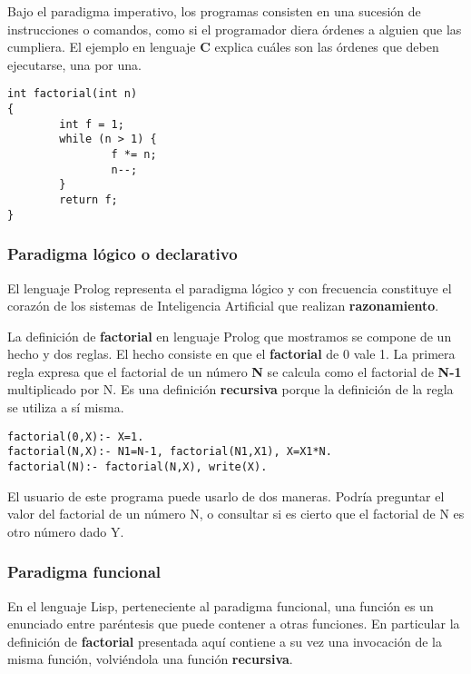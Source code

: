 \documentclass[spanish,A4,]{article}
\begin{document}
Bajo el paradigma imperativo, los programas consisten en una sucesión de
instrucciones o comandos, como si el programador diera órdenes a alguien
que las cumpliera. El ejemplo en lenguaje \textbf{C} explica cuáles son
las órdenes que deben ejecutarse, una por una.

\begin{verbatim}
int factorial(int n)
{
        int f = 1;
        while (n > 1) {
                f *= n;
                n--;
        }
        return f;
}
\end{verbatim}

\subsubsection{Paradigma lógico o
declarativo}\label{paradigma-luxf3gico-o-declarativo}

El lenguaje Prolog representa el paradigma lógico y con frecuencia
constituye el corazón de los sistemas de Inteligencia Artificial que
realizan \textbf{razonamiento}.

La definición de \textbf{factorial} en lenguaje Prolog que mostramos se
compone de un hecho y dos reglas. El hecho consiste en que el
\textbf{factorial} de 0 vale 1. La primera regla expresa que el
factorial de un número \textbf{N} se calcula como el factorial de
\textbf{N-1} multiplicado por N. Es una definición \textbf{recursiva}
porque la definición de la regla se utiliza a sí misma.

\begin{verbatim}
factorial(0,X):- X=1.
factorial(N,X):- N1=N-1, factorial(N1,X1), X=X1*N.
factorial(N):- factorial(N,X), write(X).
\end{verbatim}

El usuario de este programa puede usarlo de dos maneras. Podría
preguntar el valor del factorial de un número N, o consultar si es
cierto que el factorial de N es otro número dado Y.

\subsubsection{Paradigma funcional}\label{paradigma-funcional}

En el lenguaje Lisp, perteneciente al paradigma funcional, una función
es un enunciado entre paréntesis que puede contener a otras funciones.
En particular la definición de \textbf{factorial} presentada aquí
contiene a su vez una invocación de la misma función, volviéndola una
función \textbf{recursiva}.
\end{document}
